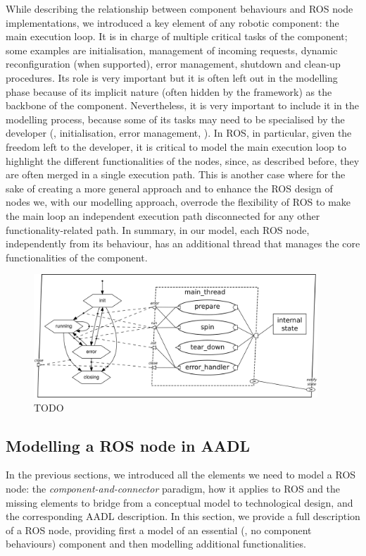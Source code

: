 While describing the relationship between component behaviours and ROS node implementations, we introduced a key element of any robotic component: the main execution loop. It is in charge of multiple critical tasks of the component; some examples are initialisation, management of incoming requests, dynamic reconfiguration (when supported), error management, shutdown and clean-up procedures. Its role is very important but it is often left out in the modelling phase because of its implicit nature (often hidden by the framework) as the backbone of the component. Nevertheless, it is very important to include it in the modelling process, because some of its tasks may need to be specialised by the developer (\eg, initialisation, error management, \etc). In ROS, in particular, given the freedom left to the developer, it is critical to model the main execution loop to highlight the different functionalities of the nodes, since, as described before, they are often merged in a single execution path. This is another case where for the sake of creating a more general approach and to enhance the ROS design of nodes we, with our modelling approach, overrode the flexibility of ROS to make the main loop an independent execution path disconnected for any other functionality-related path. In summary, in our model, each ROS node, independently from its behaviour, has an additional thread that manages the core functionalities of the component.

\begin{figure}[t]
    \centering
    \includegraphics[width=0.95\textwidth]{gfx/essential}
    \caption{TODO}\label{fig:essential}
\end{figure}

\subsection{Modelling a ROS node in AADL}
\label{sec:ros-in-aadl}
In the previous sections, we introduced all the elements we need to model a ROS node: the \textit{component-and-connector} paradigm, how it applies to ROS and the missing elements to bridge from a conceptual model to technological design, and the corresponding AADL description. In this section, we provide a full description of a ROS node, providing first a model of an essential (\ie, no component behaviours) component and then modelling additional functionalities.

